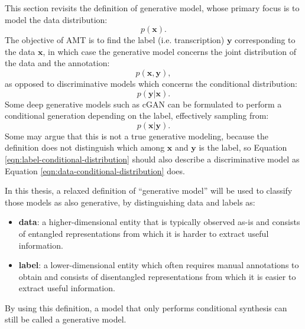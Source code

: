 This section revisits the definition of generative model, whose primary focus is to model the data distribution:
\begin{equation}\label{eqn:data-distribution}
p(\mathbf{x}).
\end{equation}
The objective of AMT is to find the label (i.e. transcription) $\mathbf{y}$ corresponding to the data $\mathbf{x}$, in which case the generative model concerns the joint distribution of the data and the annotation:
\begin{equation}\label{eqn:joint-distribution}
p(\mathbf{x}, \mathbf{y}),
\end{equation}
as opposed to discriminative models which concerns the conditional distribution:
\begin{equation}\label{eqn:data-conditional-distribution}
p(\mathbf{y} | \mathbf{x}).
\end{equation}
Some deep generative models such as cGAN \cite{mirza2014conditional} can be formulated to perform a conditional generation depending on the label, effectively sampling from:
\begin{equation}\label{eqn:label-conditional-distribution}
p(\mathbf{x} | \mathbf{y}).
\end{equation}
Some may argue that this is not a true generative modeling, because the definition does not distinguish which among $\mathbf{x}$ and $\mathbf{y}$ is the label, so Equation \ref{eqn:label-conditional-distribution} should also describe a discriminative model as Equation \ref{eqn:data-conditional-distribution} does.

In this thesis, a relaxed definition of ``generative model'' will be used to classify those models as also generative, by distinguishing data and labels as:
\begin{itemize}
	\item \textbf{data}: a higher-dimensional entity that is typically observed as-is and consists of entangled representations from which it is harder to extract useful information.
	\item \textbf{label}: a lower-dimensional entity which often requires manual annotations to obtain and consists of disentangled representations from which it is easier to extract useful information.
\end{itemize}
By using this definition, a model that only performs conditional synthesis can still be called a generative model.

